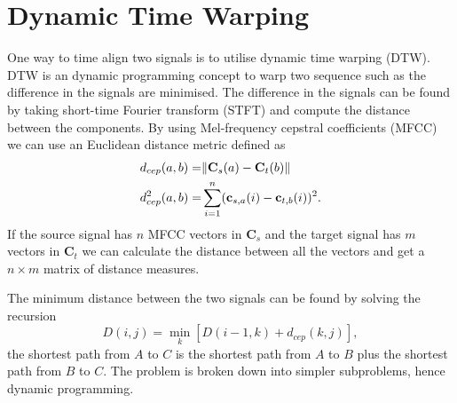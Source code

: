 \section{Dynamic Time Warping} %
\label{sec:dynamic_time_warping}
One way to time align two signals is to utilise dynamic time warping (DTW). DTW is an dynamic programming concept to warp two sequence such as the difference in the signals are minimised. The difference in the signals can be found by taking short-time Fourier transform (STFT) and compute the distance between the components. By using Mel-frequency cepstral coefficients (MFCC) we can use an Euclidean distance metric defined as \cite{atal74}
\begin{equation}
	\label{eq:dtw_distance}
	\begin{split}
		d_{cep}(a,b) = & \lVert\mathbf{C}_s(a)-\mathbf{C}_t(b)\rVert \\
		d_{cep}^2(a,b) = & \sum_{i=1}^{n} (\mathbf{c}_{s,a}(i)-\mathbf{c}_{t,b}(i))^2.
	\end{split}
\end{equation}
If the source signal has $n$ MFCC vectors in $\mathbf{C}_s$ and the target signal has $m$ vectors in $\mathbf{C}_t$ we can calculate the distance between all the vectors and get a $n\times m$ matrix of distance measures.

The minimum distance between the two signals can be found by solving the recursion \cite{taletek}
\begin{equation}
	\label{eq:recursion}
	D(i,j) = \min_k\left[D(i-1,k)+d_{cep}(k,j)\right],
\end{equation}
\ie the shortest path from $A$ to $C$ is the shortest path from $A$ to $B$ plus the shortest path from $B$ to $C$. The problem is broken down into simpler subproblems, hence dynamic programming.


